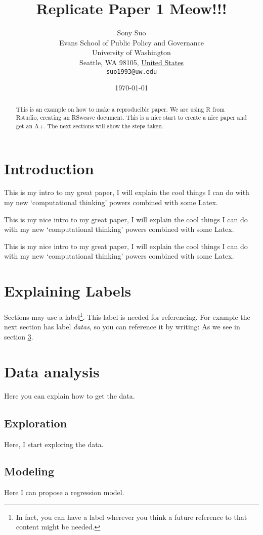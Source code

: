 \documentclass[11pt]{article}
\title{Replicate Paper 1 Meow!!!}
\author{
        Sony Suo\\
        Evans School of Public Policy and Governance\\
        University of Washington\\
        Seattle, WA 98105, \underline{United States}\\
        \texttt{suo1993@uw.edu}
}
\date{\today}
\begin{document}


\maketitle


\begin{abstract}
This is an example on how to make a reproducible paper. We are using R from Rstudio, creating an RSweave document. This is a nice start to create a nice paper and get an A+. The next sections will show the steps taken.
\end{abstract}

\section{Introduction}\label{intro}
This is my intro to my great paper, I will explain the cool things I can do with my new `computational thinking' powers combined with some Latex.

This is my nice intro to my great paper, 
I will explain the cool things I can do with my new `computational thinking' powers combined with some Latex.



This is my nice intro to my great paper, 
I will explain the cool things 
I can do with my new `computational thinking' 
powers
combined with some Latex.

\section{Explaining Labels}\label{outline}

Sections may use a label\footnote{In fact, you can have a label wherever you think a future reference to that content might be needed.}. This label is needed for referencing. For example the next section has label \emph{datas}, so you can reference it by writing: As we see in section \ref{datas}.

\section{Data analysis}\label{datas}

Here you can explain how to get the data.

\subsection{Exploration}\label{eda}

Here, I start exploring the data. 

\subsection{Modeling}\label{model}

Here I can propose a regression model.
\end{document}
